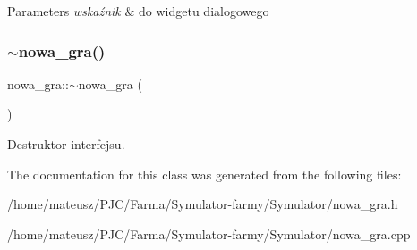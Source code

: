 \begin{DoxyParams}{Parameters}
{\em wskaźnik} & do widgetu dialogowego \\
\hline
\end{DoxyParams}
\mbox{\label{classnowa__gra_acd5a1be18c4857d7606a5ec85759f025}} 
\subsubsection{\texorpdfstring{$\sim$nowa\+\_\+gra()}{~nowa\_gra()}}
{\footnotesize\ttfamily nowa\+\_\+gra\+::$\sim$nowa\+\_\+gra (\begin{DoxyParamCaption}{ }\end{DoxyParamCaption})}



Destruktor interfejsu. 



The documentation for this class was generated from the following files\+:\begin{DoxyCompactItemize}
\item 
/home/mateusz/\+P\+J\+C/\+Farma/\+Symulator-\/farmy/\+Symulator/nowa\+\_\+gra.\+h\item 
/home/mateusz/\+P\+J\+C/\+Farma/\+Symulator-\/farmy/\+Symulator/nowa\+\_\+gra.\+cpp\end{DoxyCompactItemize}

